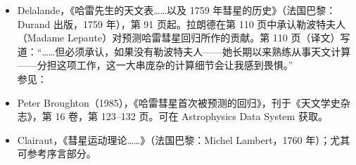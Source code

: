 \begin{enumerate}
\begin{itemize}
“……我在四月一日晚上收到一封来自海德堡的信，其中写道，今年一月二十四日在莱比锡发表了一篇德文论文，文中称这颗彗星在去年十二月二十五日和二十六日被萨克森的一位农民帕利奇看到；我难以想象这位农民是如何发现这颗彗星的……”\\
关于哈雷彗星重新发现的详细故事由约瑟夫·拉朗德（Joseph Lalande）给出，见：
\item Delalande，《哈雷先生的天文表……以及 1759 年彗星的历史》（法国巴黎：Durand 出版，1759 年），第 91 页起。拉朗德在第 110 页中承认勒波特夫人（Madame Lepaute）对预测哈雷彗星回归所作的贡献。第 110 页（译文）写道：“……但必须承认，如果没有勒波特夫人——她长期以来熟练从事天文计算——分担这项工作，这一大串庞杂的计算细节会让我感到畏惧。”\\
参见：
\item Peter Broughton（1985），《哈雷彗星首次被预测的回归》，刊于《天文学史杂志》，第 16 卷，第 123–132 页。可在 Astrophysics Data System 获取。
\item Clairaut，《彗星运动理论……》（法国巴黎：Michel Lambert，1760 年）；尤其可参考序言部分。
\end{itemize}
\end{enumerate}

















